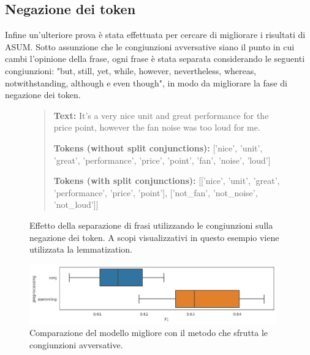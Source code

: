 \subsection{Negazione dei token}
Infine un'ulteriore prova è stata effettuata per cercare di migliorare i risultati di ASUM.
Sotto assunzione che le congiunzioni avversative siano il punto in cui cambi l'opinione della frase, ogni frase è stata separata considerando le seguenti congiunzioni: "but, still, yet, while, however, nevertheless, whereas, notwithstanding, although e even though", in modo da migliorare la fase di negazione dei token.

\begin{figure}[ht]
    \centering
    
    \begin{quote}
    \begin{mdframed}
        \textbf{Text:} It's a very nice unit and great performance for the price point, however the fan noise was too loud for me.
        
        \textbf{Tokens (without split conjunctions):} ['nice', 'unit', 'great', 'performance', 'price', 'point', 'fan', 'noise', 'loud']

        \textbf{Tokens (with split conjunctions):} [['nice', 'unit', 'great', 'performance', 'price', 'point'], ['not\_fan', 'not\_noise', 'not\_loud']]

    \end{mdframed} 
    \end{quote}
    
    \caption{Effetto della separazione di frasi utilizzando le congiunzioni sulla negazione dei token. A scopi visualizzativi in questo esempio viene utilizzata la lemmatization.}
    \label{fig:tokens-negation-example}
\end{figure}

\begin{figure}[ht]
  \centering
  \includegraphics[width=0.95\textwidth]{images/experiments/conj_exp.png}
  \caption{Comparazione del modello migliore con il metodo che sfrutta le congiunzioni avversative.}
  \label{fig:asum_conj}
\end{figure}

